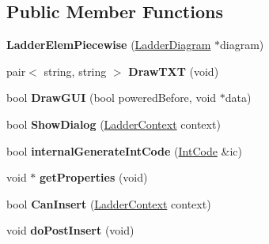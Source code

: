 \subsection*{Public Member Functions}
\begin{DoxyCompactItemize}
\item 
\hypertarget{class_ladder_elem_piecewise_adb8df9272f68d87cff9e4dd66d92876a}{{\bfseries Ladder\-Elem\-Piecewise} (\hyperlink{class_ladder_diagram}{Ladder\-Diagram} $\ast$diagram)}\label{class_ladder_elem_piecewise_adb8df9272f68d87cff9e4dd66d92876a}

\item 
\hypertarget{class_ladder_elem_piecewise_a0a59dab2a9e9a07ed8a270f00d094d16}{pair$<$ string, string $>$ {\bfseries Draw\-T\-X\-T} (void)}\label{class_ladder_elem_piecewise_a0a59dab2a9e9a07ed8a270f00d094d16}

\item 
\hypertarget{class_ladder_elem_piecewise_a1aa86c24987519214dffd262f93bdeb9}{bool {\bfseries Draw\-G\-U\-I} (bool powered\-Before, void $\ast$data)}\label{class_ladder_elem_piecewise_a1aa86c24987519214dffd262f93bdeb9}

\item 
\hypertarget{class_ladder_elem_piecewise_aeeaa636b04e697e4bd47c5477200a340}{bool {\bfseries Show\-Dialog} (\hyperlink{struct_ladder_context}{Ladder\-Context} context)}\label{class_ladder_elem_piecewise_aeeaa636b04e697e4bd47c5477200a340}

\item 
\hypertarget{class_ladder_elem_piecewise_a593aa5dab9696076795e2c13b8c6acfb}{bool {\bfseries internal\-Generate\-Int\-Code} (\hyperlink{class_int_code}{Int\-Code} \&ic)}\label{class_ladder_elem_piecewise_a593aa5dab9696076795e2c13b8c6acfb}

\item 
\hypertarget{class_ladder_elem_piecewise_a91d725552a5aa385061d97bc6c53bfc4}{void $\ast$ {\bfseries get\-Properties} (void)}\label{class_ladder_elem_piecewise_a91d725552a5aa385061d97bc6c53bfc4}

\item 
\hypertarget{class_ladder_elem_piecewise_a8325f55e3f847759396f5e1e89dbe39d}{bool {\bfseries Can\-Insert} (\hyperlink{struct_ladder_context}{Ladder\-Context} context)}\label{class_ladder_elem_piecewise_a8325f55e3f847759396f5e1e89dbe39d}

\item 
\hypertarget{class_ladder_elem_piecewise_a4d6c9eb4d20f0cc8d943370190b271e5}{void {\bfseries do\-Post\-Insert} (void)}\label{class_ladder_elem_piecewise_a4d6c9eb4d20f0cc8d943370190b271e5}


\end{DoxyCompactItemize}
